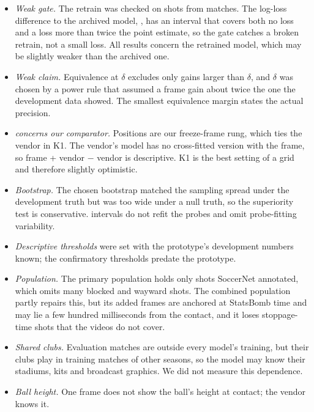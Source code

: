 \documentclass[10pt,twocolumn,letterpaper]{article}
\begin{document}
\begin{itemize}[leftmargin=*,itemsep=1pt,topsep=2pt]
  \item \emph{Weak gate.} The retrain was checked on  shots from  matches. The
  log-loss difference to the archived model, , has an interval that covers both no loss and a loss
  more than twice the point estimate, so the gate catches a broken retrain, not a small loss. All results concern the retrained model, which may be slightly weaker
  than the archived one.
  \item \emph{Weak \Htwo claim.} Equivalence at $\delta$ excludes only gains larger than $\delta$, and $\delta$ was
  chosen by a power rule that assumed a frame gain about twice the one the development data showed. The smallest
  equivalence margin states the actual precision.
  \item \emph{\Htwo concerns our comparator.} Positions are our freeze-frame rung, which ties the vendor in K1. The
  vendor's model has no cross-fitted version with the frame, so frame + vendor $-$ vendor is descriptive. K1 is the
  best setting of a grid and therefore slightly optimistic.
  \item \emph{Bootstrap.} The chosen bootstrap matched the sampling spread under the development truth but was too
  wide under a null truth, so the superiority test is conservative. \Hthree intervals do not refit the probes and
  omit probe-fitting variability.
  \item \emph{Descriptive \Hthree thresholds} were set with the prototype's development numbers known; the
  confirmatory thresholds predate the prototype.
  \item \emph{Population.} The primary population holds only shots SoccerNet annotated, which omits many blocked and
  wayward shots. The combined population partly repairs this, but its added frames are anchored at StatsBomb time and
  may lie a few hundred milliseconds from the contact, and it loses stoppage-time shots that the videos do not cover.
  \item \emph{Shared clubs.} Evaluation matches are outside every model's training, but their clubs play in training
  matches of other seasons, so the model may know their stadiums, kits and broadcast graphics. We did not measure
  this dependence.
  \item \emph{Ball height.} One frame does not show the ball's height at contact; the vendor knows it.
\end{itemize}
\end{document}

